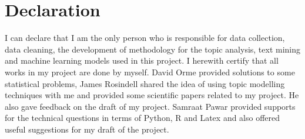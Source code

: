 \section*{Declaration}

I can declare that I am the only person who is responsible for data collection, data cleaning, the development of methodology for the topic analysis, text mining and machine learning models used in this project. I herewith certify that all works in my project are done by myself. David Orme provided solutions to some statistical problems, James Rosindell shared the idea of using topic modelling techniques with me and provided some scientific papers related to my project. He also gave feedback on the draft of my project. Samraat Pawar provided supports for the technical questions in terms of Python, R and Latex and also offered useful suggestions for my draft of the project.
